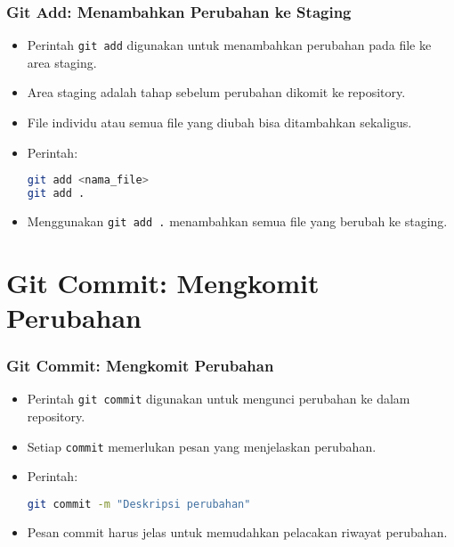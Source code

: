 \documentclass[aspectratio=169, table]{beamer}
\begin{document}
\begin{frame}[fragile]
\frametitle{Git Add: Menambahkan Perubahan ke Staging}
\vspace{15pt}
\begin{itemize}
\item Perintah \texttt{git add} digunakan untuk menambahkan perubahan pada file ke area staging.
\item Area staging adalah tahap sebelum perubahan dikomit ke repository.
\item File individu atau semua file yang diubah bisa ditambahkan sekaligus.
\item Perintah:
\begin{lstlisting}[language=bash]
git add <nama_file>
git add .
\end{lstlisting}
\item Menggunakan \texttt{git add .} menambahkan semua file yang berubah ke staging.
\end{itemize}
\end{frame}

\section{Git Commit: Mengkomit Perubahan}

\begin{frame}[fragile]
\frametitle{Git Commit: Mengkomit Perubahan}
\begin{itemize}
\item Perintah \texttt{git commit} digunakan untuk mengunci perubahan ke dalam repository.
\item Setiap \texttt{commit} memerlukan pesan yang menjelaskan perubahan.
\item Perintah:
\begin{lstlisting}[language=bash]
git commit -m "Deskripsi perubahan"
\end{lstlisting}
\item Pesan commit harus jelas untuk memudahkan pelacakan riwayat perubahan.
\end{itemize}
\end{frame}
\end{document}
